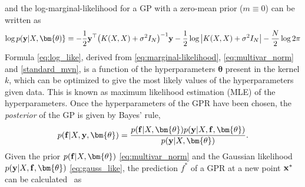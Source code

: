 and the log-marginal-likelihood for a GP with a zero-mean prior ($m \equiv 0$) can be written  as
\begin{equation}
\log{p(\bold{y}|X,\bm{\theta)}}=-\frac{1}{2}\bold{y^\top}\big(K(X,X)
+\sigma^2 I_N\big)^{-1}\bold{y}-\frac{1}{2}\log\left|K(X,X)
+\sigma^2 I_N\right|-\frac{N}{2}\log{2\pi}
\label{eq:log_like}
\end{equation}
Formula \eqref{eq:log_like}, derived from \eqref{eq:marginal-likelihood}, \eqref{eq:multivar_norm} and \eqref{standard_mvn}, is a function of the hyperparameters $\bm{\theta}$ present in the kernel $k$, which can be optimized to give the most likely values of the hyperparameters given data. This is known as maximum likelihood estimation (MLE) of the hyperparameters. 
Once the hyperparameters of the GPR have been chosen, the \emph{posterior} of the GP is given by 
Bayes' rule,
\begin{equation}
\label{eq:bayes}
p(\bold{f} | X, \bold{y}, \bm{\theta})
=
\frac{p(\bold{f} | X,\bm{\theta}) p(\bold{y} | X, \bold{f}, \bm{\theta}) }
{p(\bold{y} | X, \bm{\theta})}.
\end{equation}
Given the prior $p(\bold{f} | X,\bm{\theta})$ \eqref{eq:multivar_norm} and the Gaussian likelihood $p(\bold{y} | X, \bold{f}, \bm{\theta})$ \eqref{eq:gauss_like}, the prediction $f^*$ of a GPR at a new point $\bold{x^*}$ can be calculated~ as   
